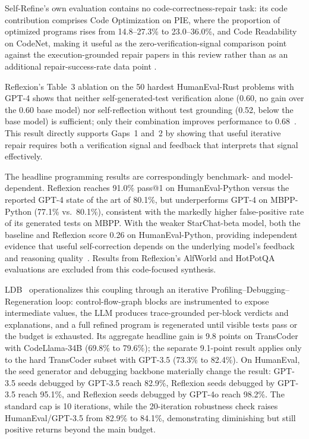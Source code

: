 \documentclass[10pt,a4paper]{article}
\begin{document}
Self-Refine's own evaluation contains no code-correctness-repair task: its code contribution comprises Code Optimization on PIE, where the proportion of optimized programs rises from 14.8--27.3\% to 23.0--36.0\%, and Code Readability on CodeNet, making it useful as the zero-verification-signal comparison point against the execution-grounded repair papers in this review rather than as an additional repair-success-rate data point \cite{madaan2023}.

Reflexion's Table~3 ablation on the 50 hardest HumanEval-Rust problems with GPT-4 shows that neither self-generated-test verification alone (0.60, no gain over the 0.60 base model) nor self-reflection without test grounding (0.52, below the base model) is sufficient; only their combination improves performance to 0.68~\cite{shinn2023}. This result directly supports Gaps~1 and~2 by showing that useful iterative repair requires both a verification signal and feedback that interprets that signal effectively.

The headline programming results are correspondingly benchmark- and model-dependent. Reflexion reaches 91.0\% pass@1 on HumanEval-Python versus the reported GPT-4 state of the art of 80.1\%, but underperforms GPT-4 on MBPP-Python (77.1\% vs.\ 80.1\%), consistent with the markedly higher false-positive rate of its generated tests on MBPP. With the weaker StarChat-beta model, both the baseline and Reflexion score 0.26 on HumanEval-Python, providing independent evidence that useful self-correction depends on the underlying model's feedback and reasoning quality~\cite{shinn2023}. Results from Reflexion's AlfWorld and HotPotQA evaluations are excluded from this code-focused synthesis.

LDB~\cite{zhong2024ldb} operationalizes this coupling through an iterative Profiling--Debugging--Regeneration loop: control-flow-graph blocks are instrumented to expose intermediate values, the LLM produces trace-grounded per-block verdicts and explanations, and a full refined program is regenerated until visible tests pass or the budget is exhausted. Its aggregate headline gain is 9.8 points on TransCoder with CodeLlama-34B (69.8\% to 79.6\%); the separate 9.1-point result applies only to the hard TransCoder subset with GPT-3.5 (73.3\% to 82.4\%). On HumanEval, the seed generator and debugging backbone materially change the result: GPT-3.5 seeds debugged by GPT-3.5 reach 82.9\%, Reflexion seeds debugged by GPT-3.5 reach 95.1\%, and Reflexion seeds debugged by GPT-4o reach 98.2\%. The standard cap is 10 iterations, while the 20-iteration robustness check raises HumanEval/GPT-3.5 from 82.9\% to 84.1\%, demonstrating diminishing but still positive returns beyond the main budget.
\end{document}
